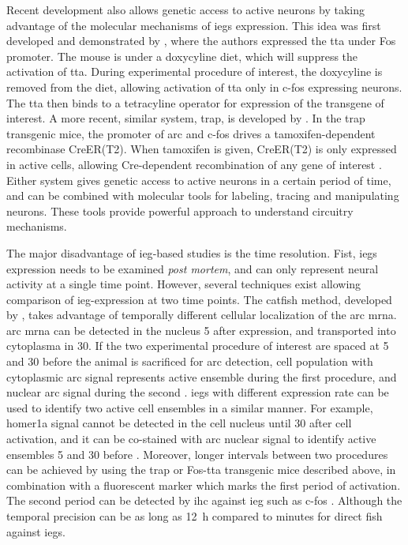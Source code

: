 Recent development also allows genetic access to active neurons by taking advantage of the molecular mechanisms of \glspl{ieg} expression. This idea was first developed and demonstrated by \citet{reijmers07}, where the authors expressed the \gls{tta} under Fos promoter. The mouse is under a doxycyline diet, which will suppress the activation of \gls{tta}. During experimental procedure of interest, the doxycyline is removed from the diet, allowing activation of \gls{tta} only in c-fos expressing neurons. The \gls{tta} then binds to a tetracyline operator for expression of the transgene of interest. A more recent, similar system, \gls{trap}, is developed by \citet{guenthner13}. In the \gls{trap} transgenic mice, the promoter of \gls{arc} and c-fos drives a tamoxifen-dependent recombinase CreER(T2). When tamoxifen is given, CreER(T2) is only expressed in active cells, allowing Cre-dependent recombination of any gene of interest \citep{guenthner13}. Either system gives genetic access to active neurons in a certain period of time, and can be combined with molecular tools for labeling, tracing and manipulating neurons. These tools provide powerful approach to understand circuitry mechanisms.

The major disadvantage of \gls{ieg}-based studies is the time resolution. Fist, \glspl{ieg} expression needs to be examined \textit{post mortem}, and can only represent neural activity at a single time point. However, several techniques exist allowing comparison of \gls{ieg}-expression at two time points. The \gls{catfish} method, developed by \citet{guzowski99}, takes advantage of temporally different cellular localization of the \gls{arc} \gls{mrna}. \Gls{arc} \gls{mrna} can be detected in the nucleus \SI{5}{\min} after expression, and transported into cytoplasma in \SI{30}{\min}. If the two experimental procedure of interest are spaced at \SI{5}{\min} and \SI{30}{\min} before the animal is sacrificed for \gls{arc} detection, cell population with cytoplasmic \gls{arc} signal represents active ensemble during the first procedure, and nuclear \gls{arc} signal during the second \citep{guzowski99}. \Glspl{ieg} with different expression rate can be used to identify two active cell ensembles in a similar manner. For example, homer1a signal cannot be detected in the cell nucleus until \SI{30}{\min} after cell activation, and it can be co-stained with \gls{arc} nuclear signal to identify active ensembles \SI{5}{\min} and \SI{30}{\min} before \citep{vazdarjanova04}. Moreover, longer intervals between two procedures can be achieved by using the \gls{trap} or Fos-\gls{tta} transgenic mice described above, in combination with a fluorescent marker which marks the first period of activation. The second period can be detected by \gls{ihc} against \gls{ieg} such as c-fos \citep{reijmers07, guenthner13}. Although the temporal precision can be as long as \SI{12}{\hour} compared to minutes for direct \gls{fish} against \glspl{ieg}.

